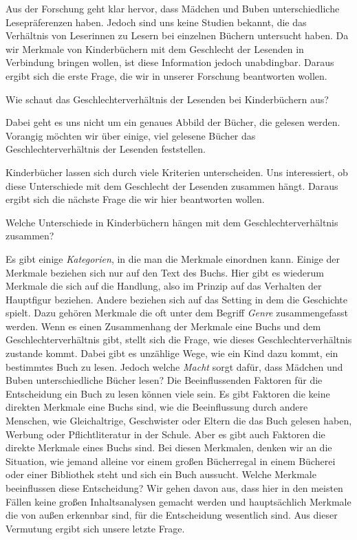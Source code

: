 Aus der Forschung geht klar hervor, dass Mädchen und Buben
unterschiedliche Lesepräferenzen haben. Jedoch sind uns keine Studien
bekannt, die das Verhältnis von Leserinnen zu Lesern bei einzelnen
Büchern untersucht haben. Da wir Merkmale von Kinderbüchern mit dem
Geschlecht der Lesenden in Verbindung bringen wollen, ist diese
Information jedoch unabdingbar. Daraus ergibt sich die erste Frage, die
wir in unserer Forschung beantworten wollen.

\begin{frage}\label{fra:andere}
   Wie schaut das Geschlechterverhältnis der Lesenden bei Kinderbüchern aus?
\end{frage}

Dabei geht es uns nicht um ein genaues Abbild der Bücher, die gelesen
werden. Vorangig möchten wir über einige, viel gelesene Bücher das
Geschlechterverhältnis der Lesenden feststellen.

Kinderbücher lassen sich durch viele Kriterien unterscheiden. Uns
interessiert, ob diese Unterschiede mit dem Geschlecht der Lesenden
zusammen hängt. Daraus ergibt sich die nächste Frage die wir hier
beantworten wollen.

\begin{frage}\label{fra:unterschiede}
Welche Unterschiede in Kinderbüchern hängen mit dem Geschlechterverhältnis zusammen?
\end{frage}

Es gibt einige \emph{Kategorien}, in die man die Merkmale einordnen
kann. Einige der Merkmale beziehen sich nur auf den Text des Buchs. Hier
gibt es wiederum Merkmale die sich auf die Handlung, also im Prinzip auf
das Verhalten der Hauptfigur beziehen. Andere beziehen sich auf das
Setting in dem die Geschichte spielt. Dazu gehören \zB Merkmale die oft
unter dem Begriff \emph{Genre} zusammengefasst werden. Wenn es einen
Zusammenhang der Merkmale eine Buchs und dem Geschlechterverhältnis
gibt, stellt sich die Frage, wie dieses Geschlechterverhältnis zustande
kommt. Dabei gibt es unzählige Wege, wie ein Kind dazu kommt, ein
bestimmtes Buch zu lesen. Jedoch welche \emph{Macht} sorgt dafür, dass
Mädchen und Buben unterschiedliche Bücher lesen? Die Beeinflussenden
Faktoren für die Entscheidung ein Buch zu lesen können viele sein. Es
gibt Faktoren die keine direkten Merkmale eine Buchs sind, wie \zB die
Beeinflussung durch andere Menschen, wie Gleichaltrige, Geschwister oder
Eltern die das Buch gelesen haben, Werbung oder Pflichtliteratur in der
Schule. Aber es gibt auch Faktoren die direkte Merkmale eines Buchs
sind. Bei diesen Merkmalen, denken wir an die Situation, wie jemand
alleine vor einem großen Bücherregal in einem Bücherei oder einer
Bibliothek steht und sich ein Buch aussucht. Welche Merkmale
beeinflussen diese Entscheidung? Wir gehen davon aus, dass hier in den
meisten Fällen keine großen Inhaltsanalysen gemacht werden und
hauptsächlich Merkmale die von außen erkennbar sind, für die
Entscheidung wesentlich sind. Aus dieser Vermutung ergibt sich unsere
letzte Frage.


